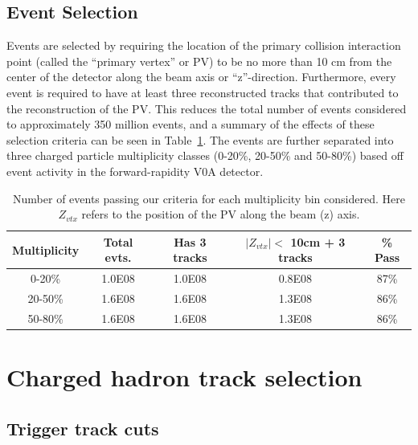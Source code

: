 \subsection{Event Selection}

Events are selected by requiring the location of the primary collision interaction point (called the ``primary vertex'' or PV) to be no more than 10 cm from the center of the detector along the beam axis or ``z''-direction. Furthermore, every event is required to have at least three reconstructed tracks that contributed to the reconstruction of the PV. This reduces the total number of events considered to approximately 350 million events, and a summary of the effects of these selection criteria can be seen in Table~\ref{tab:event_table}. The events are further separated into three charged particle multiplicity classes (0-20\%, 20-50\% and 50-80\%) based off event activity in the forward-rapidity V0A detector.

\begin{table}[h!]
    \centering
	\caption{Number of events passing our criteria for each multiplicity bin considered. Here $Z_{vtx}$ refers to the position of the PV along the beam (z) axis.}
	\label{tab:event_table}
	\begin{tabular}{| c | c | c | c || c | }
		\hline
		Multiplicity & Total evts. & Has 3 tracks & $|Z_{vtx}| <$  10cm + 3 tracks & \% Pass \\
		\hline
		0-20\% & 1.0E08 & 1.0E08 & 0.8E08 & 87\%\\
		20-50\% & 1.6E08 & 1.6E08 & 1.3E08 & 86\%\\
		50-80\% & 1.6E08 & 1.6E08 & 1.3E08 & 86\%\\
		\hline
	\end{tabular}
\end{table}


\section{Charged hadron track selection}
\label{sec:track_selection}

\subsection{Trigger track cuts}

